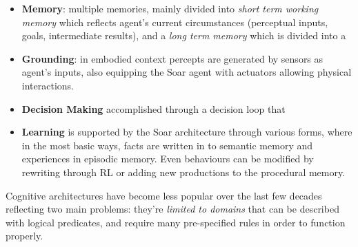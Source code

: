 \begin{itemize}
    \item \textbf{Memory}: multiple memories, mainly divided into \emph{short term working memory} which reflects agent's current circumstances (perceptual inputs, goals, intermediate results), and a \emph{long term memory} which is divided into a
    \item \textbf{Grounding}: in embodied context percepts are generated by sensors as agent's inputs, also equipping the Soar agent with actuators allowing physical interactions.
    \item \textbf{Decision Making} accomplished through a decision loop that
    \item \textbf{Learning} is supported by the Soar architecture through various forms, where in the most basic ways, facts are written in to semantic memory and experiences in episodic memory. Even behaviours can be modified by rewriting through \ac{RL} or adding new productions to the procedural memory.
\end{itemize}

Cognitive architectures have become less popular over the last few decades
reflecting two main problems: they're \emph{limited to domains} that can be
described with logical predicates, and require many pre-specified rules in order
to function properly.

